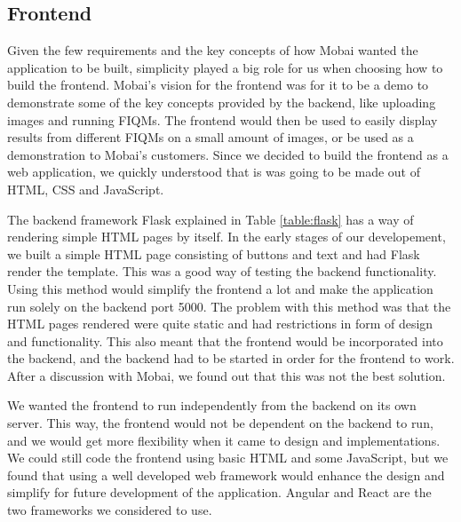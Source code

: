 \subsection*{Frontend}
Given the few requirements and the key concepts of how Mobai wanted the application to be built, simplicity played a big role for us when choosing how to build the frontend. Mobai's vision for the frontend was for it to be a demo to demonstrate some of the key concepts provided by the backend, like uploading images and running FIQMs. The frontend would then be used to easily display results from different FIQMs on a small amount of images, or be used as a demonstration to Mobai's customers. Since we decided to build the frontend as a web application, we quickly understood that is was going to be made out of HTML, CSS and JavaScript. 

The backend framework Flask explained in Table \ref{table:flask}  has a way of rendering simple HTML pages by itself. In the early stages of our developement, we built a simple HTML page consisting of buttons and text and had Flask render the template. This was a good way of testing the backend functionality. Using this method would simplify the frontend a lot and make the application run solely on the backend port 5000. The problem with this method was that the HTML pages rendered were quite static and had restrictions in form of design and functionality. This also meant that the frontend would be incorporated into the backend, and the backend had to be started in order for the frontend to work. After a discussion with Mobai, we found out that this was not the best solution. 

We wanted the frontend to run independently from the backend on its own server. This way, the frontend would not be dependent on the backend to run, and we would get more flexibility when it came to design and implementations. We could still code the frontend using basic HTML and some JavaScript, but we found that using a well developed web framework would enhance the design and simplify for future development of the application. Angular and React are the two frameworks we considered to use. 

